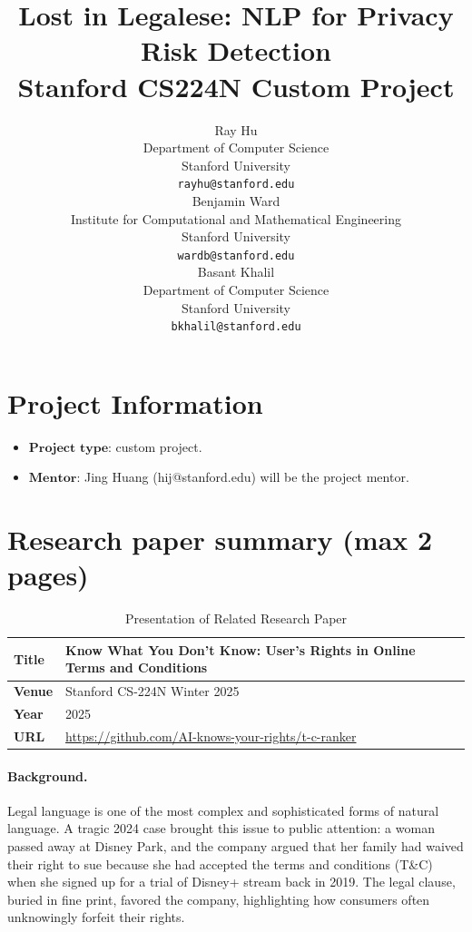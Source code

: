 \documentclass{article}
\title{
  Lost in Legalese: NLP for Privacy Risk Detection \\
  \vspace{1em}
  \small{\normalfont Stanford CS224N Custom Project}  %
}
\author{
  Ray Hu \\
  Department of Computer Science \\
  Stanford University \\
  \texttt{rayhu@stanford.edu} \\
  \And
  Benjamin Ward \\
  Institute for Computational and Mathematical Engineering \\
  Stanford University \\
  \texttt{wardb@stanford.edu} \\  
  \And
  Basant Khalil \\
  Department of Computer Science \\
  Stanford University \\
  \texttt{bkhalil@stanford.edu}
}
\newcommand{\note}[1]{\textcolor{blue}{{#1}}}
\begin{document}
\maketitle





\section{Project Information}

\begin{itemize}
    \item $\mathbf{Project}$ $\mathbf{type}$: custom project.
    \item $\mathbf{Mentor}$: Jing Huang (hij@stanford.edu) will be the project mentor.
\end{itemize}


\section{Research paper summary (max 2 pages)}

\begin{table}[h]
    \centering
    \begin{tabular}{ll}
        \toprule
        \textbf{Title} & Know What You Don't Know: User's Rights in Online Terms and Conditions \\
        \midrule
        \textbf{Venue} & Stanford CS-224N Winter 2025 \\
        \textbf{Year}  & 2025 \\
        \textbf{URL}   & \url{https://github.com/AI-knows-your-rights/t-c-ranker} \\
        \bottomrule
    \end{tabular}
    \vspace{1em}
    \caption{Presentation of Related Research Paper
    }
\end{table}

\paragraph{Background.}
Legal language is one of the most complex and sophisticated forms of natural language. A tragic 2024 case brought this issue to public attention: a woman passed away at Disney Park, and the company argued that her family had waived their right to sue because she had accepted the terms and conditions (T\&C) when she signed up for a trial of Disney+ stream back in 2019. The legal clause, buried in fine print, favored the company, highlighting how consumers often unknowingly forfeit their rights.
\end{document}
